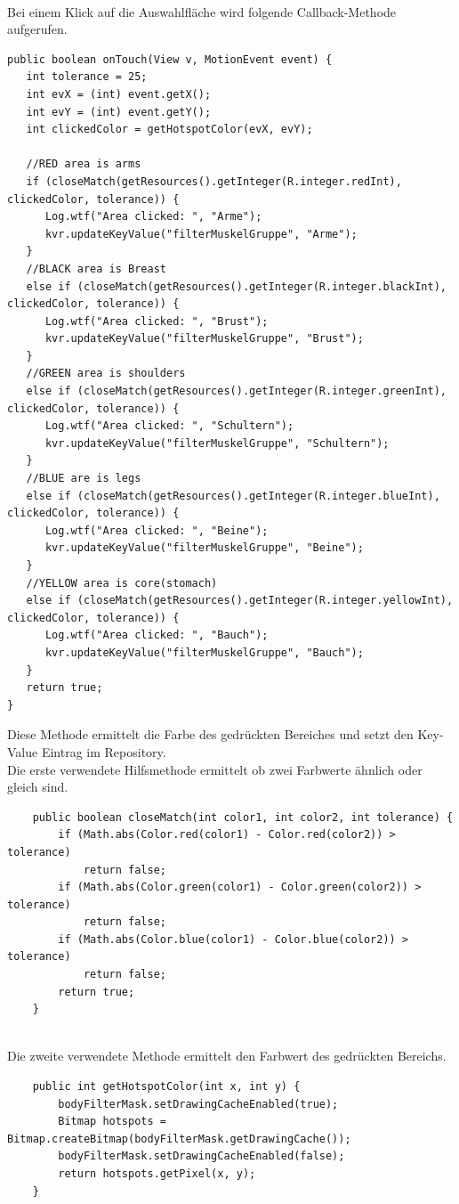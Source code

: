 \documentclass[FIPLY_base.tex]{subfiles}
\begin{document}
\newpage
\ \\
Bei einem Klick auf die Auswahlfläche wird folgende Callback-Methode aufgerufen.
\begin{lstlisting}
public boolean onTouch(View v, MotionEvent event) {
   int tolerance = 25;
   int evX = (int) event.getX();
   int evY = (int) event.getY();
   int clickedColor = getHotspotColor(evX, evY);

   //RED area is arms
   if (closeMatch(getResources().getInteger(R.integer.redInt), clickedColor, tolerance)) {
      Log.wtf("Area clicked: ", "Arme");
      kvr.updateKeyValue("filterMuskelGruppe", "Arme");
   }
   //BLACK area is Breast
   else if (closeMatch(getResources().getInteger(R.integer.blackInt), clickedColor, tolerance)) {
      Log.wtf("Area clicked: ", "Brust");
      kvr.updateKeyValue("filterMuskelGruppe", "Brust");
   }
   //GREEN area is shoulders
   else if (closeMatch(getResources().getInteger(R.integer.greenInt), clickedColor, tolerance)) {
      Log.wtf("Area clicked: ", "Schultern");
      kvr.updateKeyValue("filterMuskelGruppe", "Schultern");
   }
   //BLUE are is legs
   else if (closeMatch(getResources().getInteger(R.integer.blueInt), clickedColor, tolerance)) {
      Log.wtf("Area clicked: ", "Beine");
      kvr.updateKeyValue("filterMuskelGruppe", "Beine");
   }
   //YELLOW area is core(stomach)
   else if (closeMatch(getResources().getInteger(R.integer.yellowInt), clickedColor, tolerance)) {
      Log.wtf("Area clicked: ", "Bauch");
      kvr.updateKeyValue("filterMuskelGruppe", "Bauch");
   }
   return true;
}
\end{lstlisting}
Diese Methode ermittelt die Farbe des gedrückten Bereiches und setzt den Key-Value Eintrag im Repository.
\newpage
\ \\
Die erste verwendete Hilfsmethode ermittelt ob zwei Farbwerte ähnlich oder gleich sind.

\begin{lstlisting}
    public boolean closeMatch(int color1, int color2, int tolerance) {
        if (Math.abs(Color.red(color1) - Color.red(color2)) > tolerance)
            return false;
        if (Math.abs(Color.green(color1) - Color.green(color2)) > tolerance)
            return false;
        if (Math.abs(Color.blue(color1) - Color.blue(color2)) > tolerance)
            return false;
        return true;
    }
\end{lstlisting}

\ \\
Die zweite verwendete Methode ermittelt den Farbwert des gedrückten Bereichs.
\begin{lstlisting}
    public int getHotspotColor(int x, int y) {
        bodyFilterMask.setDrawingCacheEnabled(true);
        Bitmap hotspots = Bitmap.createBitmap(bodyFilterMask.getDrawingCache());
        bodyFilterMask.setDrawingCacheEnabled(false);
        return hotspots.getPixel(x, y);
    }
\end{lstlisting}
\end{document}
